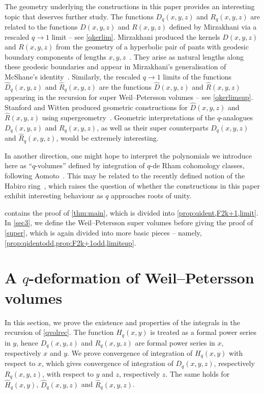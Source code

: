 \documentclass[a4paper]{article}
\theoremstyle{plain}
\theoremstyle{definition}
\begin{document}
The geometry underlying the constructions in this paper provides an interesting topic that deserves further study. The functions $D_q(x,y,z)$ and $R_q(x,y,z)$ are related to the functions $D(x,y,z)$ and $R(x,y,z)$ defined by Mirzakhani via a rescaled $q \to 1$ limit -- see \cref{qkerlim}. Mirzakhani produced the kernels $D(x,y,z)$ and $R(x,y,z)$ from the geometry of a hyperbolic pair of pants with geodesic boundary components of lengths $x, y, z$~\cite{MirSim}. They arise as natural lengths along these geodesic boundaries and appear in Mirzakhani's generalisation of McShane's identity~\cite{McSRem}. Similarly, the rescaled $q \to 1$ limits of the functions $\widehat{D}_q(x,y,z)$ and $\widehat{R}_q(x,y,z)$ are the functions $\widehat{D}(x,y,z)$ and $\widehat{R}(x,y,z)$ appearing in the recursion for super Weil--Petersson volumes -- see \cref{qkerlimsup}. Stanford and Witten produced geometric constructions for $\widehat{D}(x,y,z)$ and $\widehat{R}(x,y,z)$ using supergeometry~\cite{SWiJTG}. Geometric interpretations of the $q$-analogues $D_q(x,y,z)$ and $R_q(x,y,z)$, as well as their super counterparts $\widehat{D}_q(x,y,z)$ and $\widehat{R}_q(x,y,z)$, would be extremely interesting.


In another direction, one might hope to interpret the polynomials we introduce here as ``$q$-volumes'' defined by integration of $q$-de Rham cohomology classes, following Aomoto~\cite{AomQan}. This may be related to the recently defined notion of the Habiro ring~\cite{GSWZHab}, which raises the question of whether the constructions in this paper exhibit interesting behaviour as $q$ approaches roots of unity.


 contains the proof of \cref{thm:main}, which is divided into \cref{prop:qident,F2k+1,limit}. In \cref{sec3}, we define the Weil--Petersson super volumes before giving the proof of \cref{super}, which is again divided into more basic pieces -- namely, \cref{prop:qidentodd,prop:F2k+1odd,limitsup}.



\section{A \texorpdfstring{$q$}{q}-deformation of Weil--Petersson volumes} \label{sec2}

In this section, we prove the existence and properties of the integrals in the recursion of \cref{qvolrec}.  The function $H_q(x,y)$ is treated as a formal power series in $y$, hence $D_q(x,y,z)$ and $R_q(x,y,z)$ are formal power series in $x$, respectively $x$ and $y$.  We prove convergence of integration of $H_q(x,y)$ with respect to $x$, which gives convergence of integration of $D_q(x,y,z)$, respectively $R_q(x,y,z)$, with respect to $y$ and $z$, respectively $z$.     The same holds for $\widehat{H}_q(x,y)$, $\widehat{D}_q(x,y,z)$ and $\widehat{R}_q(x,y,z)$.
\end{document}
